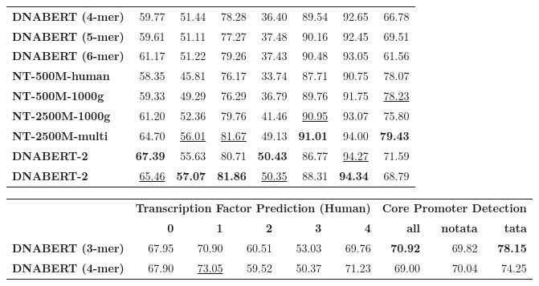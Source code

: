 \documentclass{article}
\begin{document}
\begin{table}[H]
\begin{tabular}{lrrrrrrr}
		{\textbf{DNABERT (4-mer)} } &  59.77 & 51.44 & 78.28 & 36.40 & 89.54 & 92.65 & 66.78\\

            {\textbf{DNABERT (5-mer)} } & 59.61 & 51.11 & 77.27 & 37.48  & 90.16 & 92.45 & 69.51\\

            {\textbf{DNABERT (6-mer) } } & 61.17 & 51.22 & 79.26 & 37.43 &  90.48 & 93.05 & 61.56\\

            {\textbf{NT-500M-human} } & 58.35 & 45.81 & 76.17 & 33.74 & 87.71 & 90.75 & 78.07 \\

            {\textbf{NT-500M-1000g} } &  59.33 & 49.29 & 76.29 & 36.79 & 89.76 & 91.75 & \underline{78.23} \\

            {\textbf{NT-2500M-1000g} } & 61.20 & 52.36 & 79.76 & 41.46 & \underline{90.95} & 93.07 & 75.80 \\

            {\textbf{NT-2500M-multi} } & 64.70 & \underline{56.01} & \underline{81.67} & 49.13 & \textbf{91.01} & 94.00 & \textbf{79.43} \\

		
		\midrule

            {\textbf{DNABERT-2} } & \textbf{67.39} & 55.63 & 80.71 & \textbf{50.43}   & 86.77 & \underline{94.27} & 71.59 \\

            {\textbf{DNABERT-2} } &  \underline{65.46} & \textbf{57.07} & \textbf{81.86} & \underline{50.35} & 88.31 & \textbf{94.34} & 68.79\\
		\bottomrule
	\end{tabular}


        \begin{tabular}{lrrrrrrrr}
		\toprule
  & \multicolumn{5}{c}{\textbf{Transcription Factor Prediction (Human)}} & \multicolumn{3}{c}{\textbf{Core Promoter Detection}} \\
		\cmidrule(lr){2-6}  \cmidrule(lr){7-9}
		& \textbf{ 0 } & \textbf{ 1 } & \textbf{ 2 } & \textbf{ 3 } & \textbf{4} & \textbf{all} & \textbf{notata} & \textbf{tata} \\
		\midrule
		{\textbf{DNABERT (3-mer)} } & 67.95 & 70.90 & 60.51 & 53.03 & 69.76 & \textbf{70.92} & 69.82 & \textbf{78.15} \\
		
		{\textbf{DNABERT (4-mer)} } & 67.90 & \underline{73.05} & 59.52 & 50.37 & 71.23 & 69.00 & 70.04 & 74.25\\


\end{tabular}
\end{table}
\end{document}
